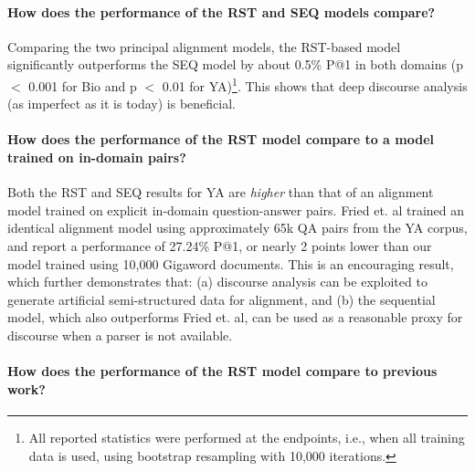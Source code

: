 \paragraph{How does the performance of the RST and SEQ models compare?}
Comparing the two principal alignment models, the RST-based model significantly outperforms the SEQ model by about 0.5\% P@1 in both domains (p $<$ 0.001 for Bio and p $<$ 0.01 for YA)\footnote{All reported statistics were performed at the endpoints, i.e., when all training data is used, using bootstrap resampling with 10,000 iterations.}. This shows that deep discourse analysis (as imperfect as it is today) is beneficial. 

\paragraph{How does the performance of the RST model compare to a model trained on in-domain pairs?}

Both the RST and SEQ results for YA are {\em higher} than that of an alignment model trained on explicit in-domain question-answer pairs. Fried et. al \citeyear{fried15} trained an identical alignment model using approximately 65k QA pairs from the YA corpus, and report a performance of 27.24\% P@1, or nearly 2 points lower than our model trained using 10,000 Gigaword documents. This is an encouraging result, which further demonstrates that: (a) discourse analysis can be exploited to generate artificial semi-structured data for alignment, and (b) the sequential model, which also outperforms Fried et. al, can be used as a reasonable proxy for discourse when a parser is not available. 


\paragraph{How does the performance of the RST model compare to previous work?}

